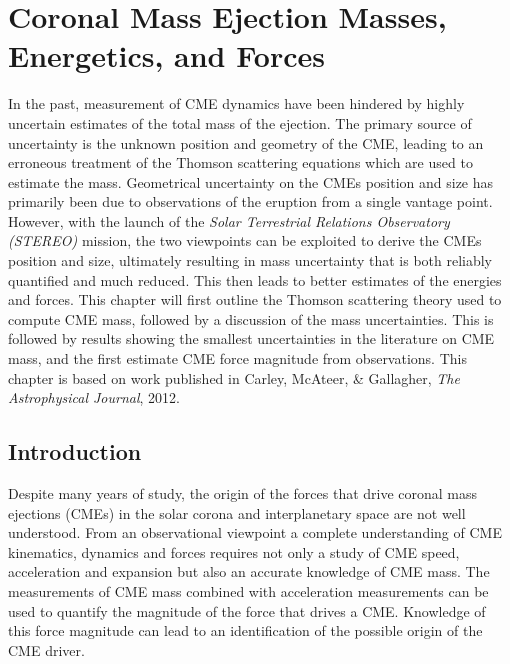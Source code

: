 
\singlespacing
\chapter{Coronal Mass Ejection Masses, Energetics, and Forces} 
\label{chap:4}
\vspace{-10mm}
\doublespacing
In the past, measurement of CME dynamics have been hindered by highly uncertain estimates of the total mass of the ejection. The primary source of uncertainty is the unknown position and geometry of the CME, leading to an erroneous treatment of the Thomson scattering equations which are used to estimate the mass. Geometrical uncertainty on the CMEs position and size has primarily been due to observations of the eruption from a single vantage point. However, with the launch of the {\it Solar Terrestrial Relations Observatory (STEREO)} mission, the two viewpoints can be exploited to derive the CMEs position and size, ultimately resulting in mass uncertainty that is both reliably quantified and much reduced. This then leads to better estimates of the energies and forces. This chapter will first outline the Thomson scattering theory used to compute CME mass, followed by a discussion of the mass uncertainties. This is followed by results showing the smallest uncertainties in the literature on CME mass, and the first estimate CME force magnitude from observations. This chapter is based on work published in Carley, McAteer, \& Gallagher, {\it The Astrophysical Journal}, 2012.

\section{Introduction}\label{sec:1}

Despite many years of study, the origin of the forces that drive coronal mass ejections (CMEs) in the solar corona and interplanetary space are not well understood. From an observational viewpoint a complete understanding of CME kinematics, dynamics and forces requires not only a study of CME speed, acceleration and expansion but also an accurate knowledge of CME mass.  The measurements of CME mass combined with acceleration measurements can be used to quantify the magnitude of the force that drives a CME. Knowledge of this force magnitude can lead to an identification of the possible origin of the CME driver. 

